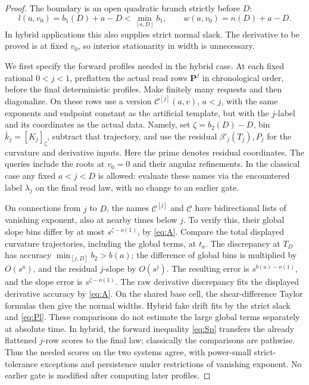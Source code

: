 \begin{proof}
The boundary is an open quadratic branch strictly before $D$:
\[
 l(a,v_0)=b_1(D)+a-D<\min_{[a,D]}b_1,
 \qquad w(a,v_0)=n(D)+a-D.
\]
In hybrid applications this also supplies strict normal slack.  The
derivative to be proved is at fixed $v_0$, so interior stationarity
in width is unnecessary.

We first specify the forward profiles needed in the hybrid case.
At each fixed rational $0<j<1$, preflatten the actual read rows
$\mathbf P^j$ in chronological order, before the final deterministic
profiles.  Make finitely many requests and then diagonalize.  On
these rows use a version $\mathcal C^{[j]}(a,v)$, $a<j$, with the
same exponents and endpoint constant as the artificial template,
but with the $j$-label and its coordinates as the actual data.
Namely, set $\zeta=b_2(D)-D$, bin $\bar k_j=[K_j]_\zeta$,
subtract that trajectory, and use the residual
$\beta'_j(T_j),P_j$ for the curvature and derivative inputs.
Here the prime denotes residual coordinates.  The queries include
the roots at $v_0=0$ and their angular refinements.  In the classical
case any fixed $a<j<D$ is allowed: evaluate these names via the
encountered label $\lambda_j$ on the final read law, with no change
to an earlier gate.

On connections from $j$ to $D$, the names $\mathcal C^{[j]}$ and
$\mathcal C$ have bidirectional lists of vanishing exponent,
also at nearby times below $j$.  To verify this, their global slope
bins differ by at most $s^{\zeta-o(1)}$, by \eqref{eq:A}.
Compare the total displayed curvature trajectories, including the
global terms, at $t_a$.  The discrepancy at $T_D$ has accuracy
$\min_{[j,D]}b_2>b(a)$; the difference of global bins is multiplied
by $O(s^a)$, and the residual $j$-slope by $O(s^j)$.
The resulting error is $s^{b(a)-o(1)}$, and the slope error is
$s^{\zeta-o(1)}$.  The raw derivative discrepancy fits the
displayed derivative accuracy by \eqref{eq:A}.  On the shared base
cell, the shear-difference Taylor formulas then give the normal
widths.  Hybrid fake drift fits by the strict slack and
\eqref{eq:Pl}.  These comparisons do not estimate the large
global terms separately at absolute time.  In hybrid, the forward
inequality \eqref{eq:Sp} transfers the already flattened $j$-row
scores to the final law; classically the comparisons are pathwise.
Thus the needed scores on the two systems agree, with power-small
strict-tolerance exceptions and persistence under restrictions of
vanishing exponent.  No earlier gate is modified after computing
later profiles.


\end{proof}
